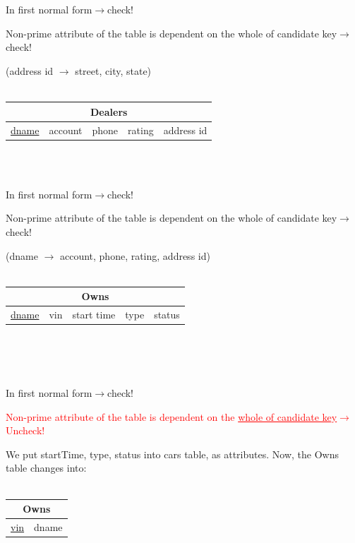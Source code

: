 \documentclass[12pt]{article}
\begin{document}
~\\~\\
\par In first normal form\hfill$\rightarrow$check!
\par Non-prime attribute of the table is dependent on the whole of candidate key\hfill$\rightarrow$check!
\par (address id $\rightarrow$ street, city, state)\\
~\\
\begin{tabularx}{\textwidth}{|X|X|X|X|X|}
\hline
\multicolumn{5}{|c|}{Dealers}\\\hline
\underline{dname} & account & phone & rating & \cellcolor{green!25}address id\\\hline
\end{tabularx}
~\\~\\
\par In first normal form\hfill$\rightarrow$check!
\par Non-prime attribute of the table is dependent on the whole of candidate key\hfill$\rightarrow$check!
\par (dname $\rightarrow$ account, phone, rating, address id)\\
~\\
\begin{tabularx}{\textwidth}{|X|X|X|X|X|}
\hline
\multicolumn{5}{|c|}{Owns}\\\hline
\underline{dname} & vin & start time & type & status\\\hline
\end{tabularx}
~\\~\\~\\
\par In first normal form\hfill$\rightarrow$check!
\par \textcolor{red}{Non-prime attribute of the table is dependent on the \underline{whole of candidate key}\hfill$\rightarrow$Uncheck!}
\par We put startTime, type, status into cars table, as attributes. Now, the Owns table changes into:\\
~\\
\begin{tabularx}{\textwidth}{|X|X|}
\hline
\multicolumn{2}{|c|}{Owns}\\\hline
\underline{vin} & dname\\\hline
\end{tabularx}
~\\~\\
\end{document}
